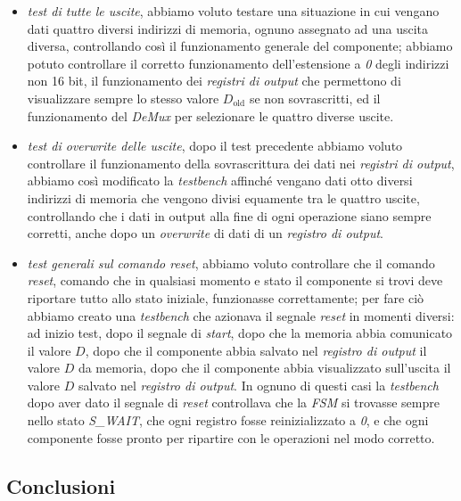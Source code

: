 \begin{itemize}
\tightlist
\item
  \emph{test di tutte le uscite}, abbiamo voluto testare una situazione
  in cui vengano dati quattro diversi indirizzi di memoria, ognuno
  assegnato ad una uscita diversa, controllando così il funzionamento
  generale del componente; abbiamo potuto controllare il corretto
  funzionamento dell'estensione a \emph{0} degli indirizzi non 16 bit,
  il funzionamento dei \emph{registri di output} che permettono di
  visualizzare sempre lo stesso valore \(D_\text{old}\) se non
  sovrascritti, ed il funzionamento del \emph{DeMux} per selezionare le
  quattro diverse uscite.
\item
  \emph{test di overwrite delle uscite}, dopo il test precedente abbiamo
  voluto controllare il funzionamento della sovrascrittura dei dati nei
  \emph{registri di output}, abbiamo così modificato la \emph{testbench}
  affinché vengano dati otto diversi indirizzi di memoria che vengono
  divisi equamente tra le quattro uscite, controllando che i dati in
  output alla fine di ogni operazione siano sempre corretti, anche dopo
  un \emph{overwrite} di dati di un \emph{registro di output}.
\item
  \emph{test generali sul comando reset}, abbiamo voluto controllare che
  il comando \emph{reset}, comando che in qualsiasi momento e stato il
  componente si trovi deve riportare tutto allo stato iniziale,
  funzionasse correttamente; per fare ciò abbiamo creato una
  \emph{testbench} che azionava il segnale \emph{reset} in momenti
  diversi: ad inizio test, dopo il segnale di \emph{start}, dopo che la
  memoria abbia comunicato il valore \(D\), dopo che il componente abbia
  salvato nel \emph{registro di output} il valore \(D\) da memoria, dopo
  che il componente abbia visualizzato sull'uscita il valore \(D\)
  salvato nel \emph{registro di output}. In ognuno di questi casi la
  \emph{testbench} dopo aver dato il segnale di \emph{reset} controllava
  che la \emph{FSM} si trovasse sempre nello stato \emph{S\_WAIT}, che
  ogni registro fosse reinizializzato a \emph{0}, e che ogni componente
  fosse pronto per ripartire con le operazioni nel modo corretto.
\end{itemize}

\pagebreak

\hypertarget{conclusioni}{%
\subsection{Conclusioni}\label{conclusioni}}


